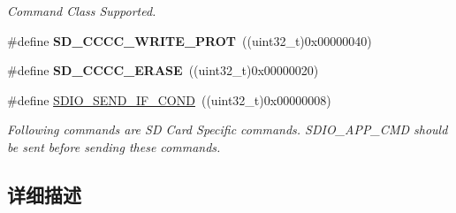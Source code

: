 \begin{DoxyCompactItemize}
\begin{DoxyCompactList}\small\item\em Command Class Supported. \end{DoxyCompactList}\item 
\#define {\bfseries S\+D\+\_\+\+C\+C\+C\+C\+\_\+\+W\+R\+I\+T\+E\+\_\+\+P\+R\+OT}~((uint32\+\_\+t)0x00000040)\hypertarget{group___s_t_m324x_g___e_v_a_l___s_d_i_o___s_d___private___defines_gad8cbc04a4adf7c5588ddeb8e29f391f2}{}\label{group___s_t_m324x_g___e_v_a_l___s_d_i_o___s_d___private___defines_gad8cbc04a4adf7c5588ddeb8e29f391f2}

\item 
\#define {\bfseries S\+D\+\_\+\+C\+C\+C\+C\+\_\+\+E\+R\+A\+SE}~((uint32\+\_\+t)0x00000020)\hypertarget{group___s_t_m324x_g___e_v_a_l___s_d_i_o___s_d___private___defines_gaf8f161db032555d848d233e6883e1ddf}{}\label{group___s_t_m324x_g___e_v_a_l___s_d_i_o___s_d___private___defines_gaf8f161db032555d848d233e6883e1ddf}

\item 
\#define \hyperlink{group___s_t_m324x_g___e_v_a_l___s_d_i_o___s_d___private___defines_gafe1c9bdbdccf901be62203bf5547147e}{S\+D\+I\+O\+\_\+\+S\+E\+N\+D\+\_\+\+I\+F\+\_\+\+C\+O\+ND}~((uint32\+\_\+t)0x00000008)\hypertarget{group___s_t_m324x_g___e_v_a_l___s_d_i_o___s_d___private___defines_gafe1c9bdbdccf901be62203bf5547147e}{}\label{group___s_t_m324x_g___e_v_a_l___s_d_i_o___s_d___private___defines_gafe1c9bdbdccf901be62203bf5547147e}

\begin{DoxyCompactList}\small\item\em Following commands are SD Card Specific commands. S\+D\+I\+O\+\_\+\+A\+P\+P\+\_\+\+C\+MD should be sent before sending these commands. \end{DoxyCompactList}\end{DoxyCompactItemize}


\subsection{详细描述}
